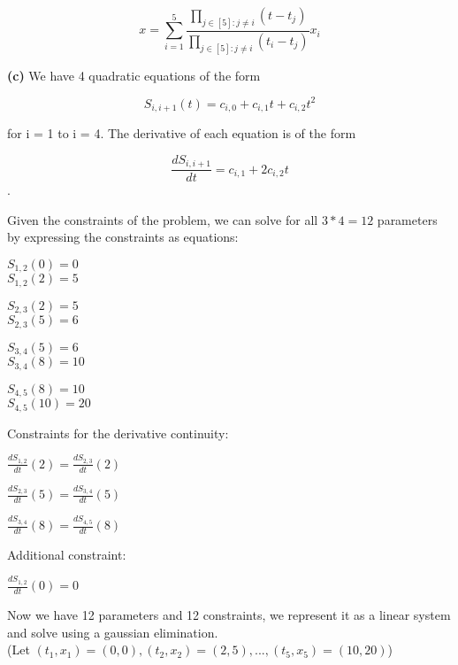 \documentclass[11pt,letterpaper]{article}
\renewcommand{\part}[1] {\vspace{.10in} {\bf (#1)}}
\begin{document}
$$x = \sum_{i=1}^{5} \frac{\prod_{j \in [5] : j \neq i} (t - t_j)}{\prod_{j \in [5] : j \neq i} (t_i - t_j)} x_i$$

\part{c}
We have 4 quadratic equations of the form

$$S_{i,i+1}(t) = c_{i,0} + c_{i,1} t + c_{i,2} t^2$$

for i = 1 to i = 4. The derivative of each equation is of the form

$$\frac{dS_{i,i+1}}{dt} = c_{i,1} + 2c_{i,2} t$$.

Given the constraints of the problem, we can solve for all $3 * 4 = 12$ parameters by expressing the constraints as equations:

$S_{1,2}(0) = 0$\\
$S_{1,2}(2) = 5$

$S_{2,3}(2) = 5$\\
$S_{2,3}(5) = 6$

$S_{3,4}(5) = 6$\\
$S_{3,4}(8) = 10$

$S_{4,5}(8) = 10$\\
$S_{4,5}(10) = 20$

Constraints for the derivative continuity:

$\frac{dS_{1,2}}{dt}(2) = \frac{dS_{2,3}}{dt}(2)$

$\frac{dS_{2,3}}{dt}(5) = \frac{dS_{3,4}}{dt}(5)$

$\frac{dS_{3,4}}{dt}(8) = \frac{dS_{4,5}}{dt}(8)$

Additional constraint:

$\frac{dS_{1,2}}{dt}(0) = 0$


Now we have 12 parameters and 12 constraints, we represent it as a linear system and solve using a gaussian elimination.\\
(Let $(t_1, x_1) = (0,0), (t_2, x_2) = (2,5), ... , (t_5,x_5) = (10,20) $)
\end{document}
